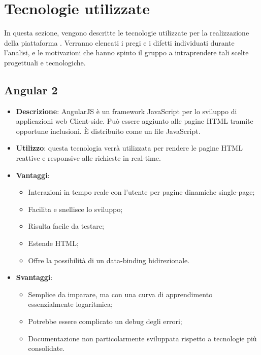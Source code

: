 \newpage
\section{Tecnologie utilizzate}
In questa sezione, vengono descritte le tecnologie utilizzate per la realizzazione della piattaforma \progetto. Verranno elencati i pregi e i difetti individuati durante l'analisi, e le motivazioni che hanno spinto il gruppo \textit{\gruppo} a intraprendere tali scelte progettuali e tecnologiche.

\subsection{Angular 2}
\begin{itemize}
	\item \textbf{Descrizione}: AngularJS è un framework JavaScript per lo sviluppo di applicazioni web Client-side. Può essere aggiunto alle pagine HTML tramite opportune inclusioni. \MakeUppercase{è} distribuito come un file JavaScript.
	\item \textbf{Utilizzo}: questa tecnologia verrà utilizzata per rendere le pagine HTML reattive e responsive alle richieste in real-time.
	\item \textbf{Vantaggi}: 
	\begin{itemize}
		\item Interazioni in tempo reale con l'utente per pagine dinamiche single-page;
		\item Facilita e snellisce lo sviluppo;
		\item Risulta facile da testare;
		\item Estende HTML;
		\item Offre la possibilità di un data-binding bidirezionale.
	\end{itemize}
	\item \textbf{Svantaggi}:
	\begin{itemize}
		\item Semplice da imparare, ma con una curva di apprendimento essenzialmente logaritmica;
		\item Potrebbe essere complicato un debug degli errori;
		\item Documentazione non particolarmente sviluppata rispetto a tecnologie più consolidate.
	\end{itemize}
\end{itemize}

